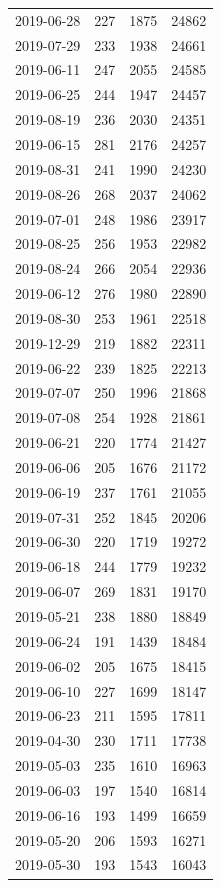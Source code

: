 \begin{tabular}{lrrr}
2019-06-28 & 227 & 1875 & 24862 \\
2019-07-29 & 233 & 1938 & 24661 \\
2019-06-11 & 247 & 2055 & 24585 \\
2019-06-25 & 244 & 1947 & 24457 \\
2019-08-19 & 236 & 2030 & 24351 \\
2019-06-15 & 281 & 2176 & 24257 \\
2019-08-31 & 241 & 1990 & 24230 \\
2019-08-26 & 268 & 2037 & 24062 \\
2019-07-01 & 248 & 1986 & 23917 \\
2019-08-25 & 256 & 1953 & 22982 \\
2019-08-24 & 266 & 2054 & 22936 \\
2019-06-12 & 276 & 1980 & 22890 \\
2019-08-30 & 253 & 1961 & 22518 \\
2019-12-29 & 219 & 1882 & 22311 \\
2019-06-22 & 239 & 1825 & 22213 \\
2019-07-07 & 250 & 1996 & 21868 \\
2019-07-08 & 254 & 1928 & 21861 \\
2019-06-21 & 220 & 1774 & 21427 \\
2019-06-06 & 205 & 1676 & 21172 \\
2019-06-19 & 237 & 1761 & 21055 \\
2019-07-31 & 252 & 1845 & 20206 \\
2019-06-30 & 220 & 1719 & 19272 \\
2019-06-18 & 244 & 1779 & 19232 \\
2019-06-07 & 269 & 1831 & 19170 \\
2019-05-21 & 238 & 1880 & 18849 \\
2019-06-24 & 191 & 1439 & 18484 \\
2019-06-02 & 205 & 1675 & 18415 \\
2019-06-10 & 227 & 1699 & 18147 \\
2019-06-23 & 211 & 1595 & 17811 \\
2019-04-30 & 230 & 1711 & 17738 \\
2019-05-03 & 235 & 1610 & 16963 \\
2019-06-03 & 197 & 1540 & 16814 \\
2019-06-16 & 193 & 1499 & 16659 \\
2019-05-20 & 206 & 1593 & 16271 \\
2019-05-30 & 193 & 1543 & 16043 \\

\end{tabular}
